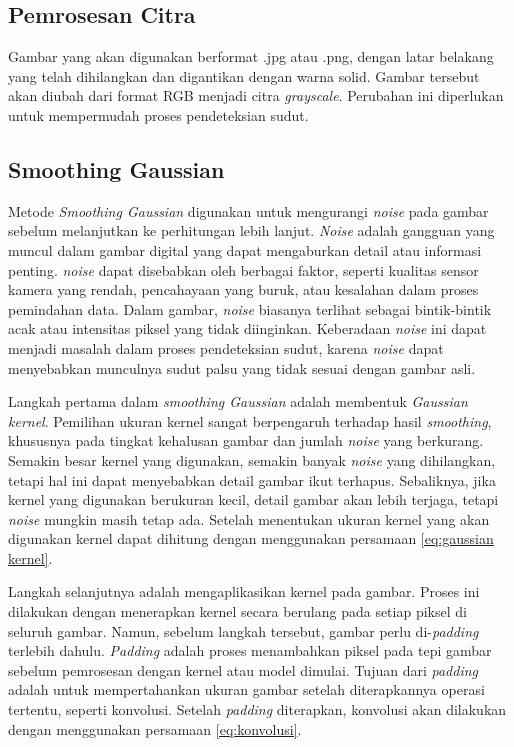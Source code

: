 \subsection{\textbf{Pemrosesan Citra}}
    Gambar yang akan digunakan berformat .jpg atau .png, dengan latar belakang yang telah dihilangkan dan digantikan dengan warna solid. 
Gambar tersebut akan diubah dari format RGB menjadi citra \emph{grayscale}. Perubahan ini diperlukan untuk mempermudah proses pendeteksian sudut. 

\newpage
\subsection{\textbf{Smoothing Gaussian}}
    Metode \emph{Smoothing Gaussian} digunakan untuk mengurangi \emph{noise} pada gambar sebelum melanjutkan ke perhitungan lebih lanjut.
\emph{Noise} adalah gangguan yang muncul dalam gambar digital yang dapat mengaburkan detail atau informasi penting. \emph{noise} dapat disebabkan oleh berbagai faktor, seperti kualitas sensor kamera yang rendah, pencahayaan yang buruk, atau kesalahan dalam proses pemindahan data.
Dalam gambar, \emph{noise} biasanya terlihat sebagai bintik-bintik acak atau intensitas piksel yang tidak diinginkan. Keberadaan \emph{noise} ini dapat menjadi masalah dalam proses pendeteksian sudut, karena \emph{noise} dapat menyebabkan munculnya sudut palsu yang tidak sesuai dengan gambar asli.
    
    Langkah pertama dalam \emph{smoothing Gaussian} adalah membentuk \emph{Gaussian kernel}. Pemilihan ukuran kernel sangat berpengaruh terhadap hasil \emph{smoothing}, khususnya pada tingkat kehalusan gambar dan jumlah \emph{noise} yang berkurang.
Semakin besar kernel yang digunakan, semakin banyak \emph{noise} yang dihilangkan, tetapi hal ini dapat menyebabkan detail gambar ikut terhapus. Sebaliknya, jika kernel yang digunakan berukuran kecil, detail gambar akan lebih terjaga, tetapi \emph{noise} mungkin masih tetap ada.
Setelah menentukan ukuran kernel yang akan digunakan kernel dapat dihitung dengan menggunakan persamaan \eqref{eq:gaussian kernel}.

    Langkah selanjutnya adalah mengaplikasikan kernel pada gambar. Proses ini dilakukan dengan menerapkan kernel secara berulang pada setiap piksel di seluruh gambar.
Namun, sebelum langkah tersebut, gambar perlu di-\emph{padding} terlebih dahulu. \emph{Padding} adalah proses menambahkan piksel pada tepi gambar sebelum pemrosesan dengan kernel atau model dimulai.
Tujuan dari \emph{padding} adalah untuk mempertahankan ukuran gambar setelah diterapkannya operasi tertentu, seperti konvolusi. 
Setelah \emph{padding} diterapkan, konvolusi akan dilakukan dengan menggunakan persamaan \eqref{eq:konvolusi}. 

